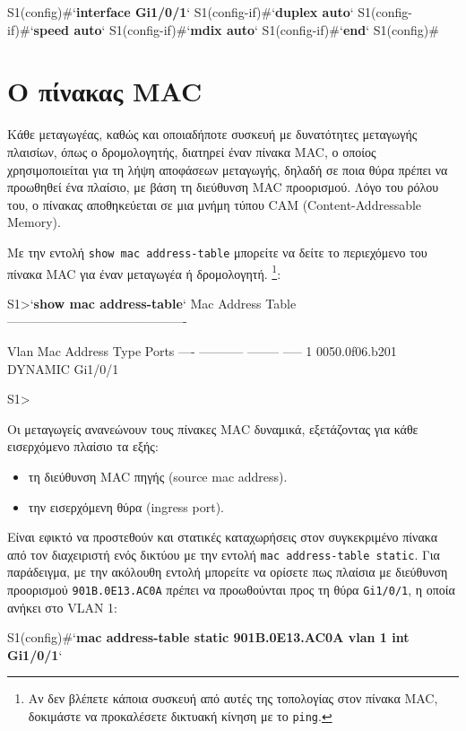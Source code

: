 \documentclass{EdipyLabs} %
\begin{document}
\begin{CommandBox}
S1(config)#`\textbf{interface Gi1/0/1}`
S1(config-if)#`\textbf{duplex auto}`
S1(config-if)#`\textbf{speed auto}`
S1(config-if)#`\textbf{mdix auto}`
S1(config-if)#`\textbf{end}`
S1(config)#
\end{CommandBox}

\section{Ο πίνακας MAC}
Κάθε μεταγωγέας, καθώς και οποιαδήποτε συσκευή με δυνατότητες μεταγωγής πλαισίων, όπως ο δρομολογητής, διατηρεί έναν πίνακα MAC, ο οποίος χρησιμοποιείται για τη λήψη αποφάσεων μεταγωγής, δηλαδή σε ποια θύρα πρέπει να προωθηθεί ένα πλαίσιο, με βάση τη διεύθυνση MAC προορισμού. Λόγο του ρόλου του, ο πίνακας αποθηκεύεται σε μια μνήμη τύπου CAM (Content-Addressable Memory).

Με την εντολή \texttt{show mac address-table} μπορείτε να δείτε το περιεχόμενο του πίνακα MAC για έναν μεταγωγέα ή δρομολογητή. \footnote{Αν δεν βλέπετε κάποια συσκευή από αυτές της τοπολογίας στον πίνακα MAC, δοκιμάστε να προκαλέσετε δικτυακή κίνηση με το \texttt{ping}.}:

\begin{CommandBox}
S1>`\textbf{show mac address-table}`
          Mac Address Table
-------------------------------------------

Vlan    Mac Address       Type        Ports
----    -----------       --------    -----
   1    0050.0f06.b201    DYNAMIC     Gi1/0/1

S1> 
\end{CommandBox}

Οι μεταγωγείς ανανεώνουν τους πίνακες MAC δυναμικά, εξετάζοντας για κάθε εισερχόμενο πλαίσιο τα εξής:
\begin{itemize}
	\item τη διεύθυνση MAC πηγής (source mac address).
	\item την εισερχόμενη θύρα (ingress port).
\end{itemize}
Είναι εφικτό να προστεθούν και στατικές καταχωρήσεις στον συγκεκριμένο πίνακα από τον διαχειριστή ενός δικτύου με την εντολή \texttt{mac address-table static}. Για παράδειγμα, με την ακόλουθη εντολή μπορείτε να ορίσετε πως πλαίσια με διεύθυνση προορισμού \texttt{901B.0E13.AC0A} πρέπει να προωθούνται προς τη θύρα \texttt{Gi1/0/1}, η οποία ανήκει στο VLAN 1:

\begin{CommandBox}
S1(config)#`\textbf{mac address-table static 901B.0E13.AC0A vlan 1 int Gi1/0/1}`
\end{CommandBox}
\end{document}
